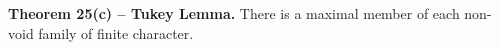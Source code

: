 \textbf{Theorem 25(c) -- Tukey Lemma.} There is a maximal member of each non-void family of finite character.
